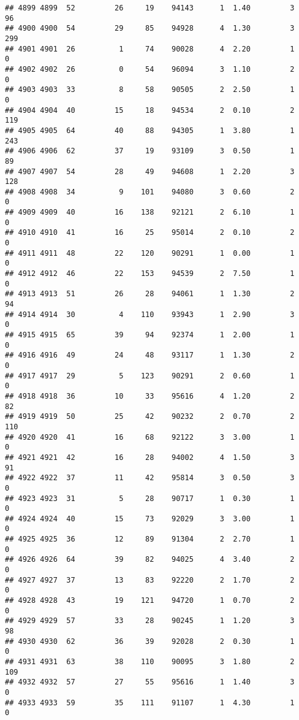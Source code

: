 \documentclass[
]{article}
\begin{document}
\begin{verbatim}
## 4899 4899  52         26     19    94143      1  1.40         3       96
## 4900 4900  54         29     85    94928      4  1.30         3      299
## 4901 4901  26          1     74    90028      4  2.20         1        0
## 4902 4902  26          0     54    96094      3  1.10         2        0
## 4903 4903  33          8     58    90505      2  2.50         1        0
## 4904 4904  40         15     18    94534      2  0.10         2      119
## 4905 4905  64         40     88    94305      1  3.80         1      243
## 4906 4906  62         37     19    93109      3  0.50         1       89
## 4907 4907  54         28     49    94608      1  2.20         3      128
## 4908 4908  34          9    101    94080      3  0.60         2        0
## 4909 4909  40         16    138    92121      2  6.10         1        0
## 4910 4910  41         16     25    95014      2  0.10         2        0
## 4911 4911  48         22    120    90291      1  0.00         1        0
## 4912 4912  46         22    153    94539      2  7.50         1        0
## 4913 4913  51         26     28    94061      1  1.30         2       94
## 4914 4914  30          4    110    93943      1  2.90         3        0
## 4915 4915  65         39     94    92374      1  2.00         1        0
## 4916 4916  49         24     48    93117      1  1.30         2        0
## 4917 4917  29          5    123    90291      2  0.60         1        0
## 4918 4918  36         10     33    95616      4  1.20         2       82
## 4919 4919  50         25     42    90232      2  0.70         2      110
## 4920 4920  41         16     68    92122      3  3.00         1        0
## 4921 4921  42         16     28    94002      4  1.50         3       91
## 4922 4922  37         11     42    95814      3  0.50         3        0
## 4923 4923  31          5     28    90717      1  0.30         1        0
## 4924 4924  40         15     73    92029      3  3.00         1        0
## 4925 4925  36         12     89    91304      2  2.70         1        0
## 4926 4926  64         39     82    94025      4  3.40         2        0
## 4927 4927  37         13     83    92220      2  1.70         2        0
## 4928 4928  43         19    121    94720      1  0.70         2        0
## 4929 4929  57         33     28    90245      1  1.20         3       98
## 4930 4930  62         36     39    92028      2  0.30         1        0
## 4931 4931  63         38    110    90095      3  1.80         2      109
## 4932 4932  57         27     55    95616      1  1.40         3        0
## 4933 4933  59         35    111    91107      1  4.30         1        0

\end{verbatim}
\end{document}

